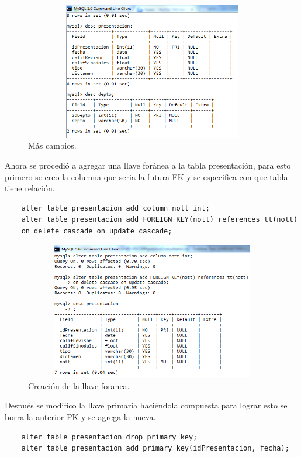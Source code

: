 \documentclass[12pt, titlepage]{article}
\begin{document}
\begin{figure}[H]
    \begin{center}
        \includegraphics[width=12cm, height=6cm]{img/mascambios.png}
        \caption{Más cambios.}
        \label{fig:cambios2}
    \end{center}
\end{figure}
    Ahora se procedió a agregar una llave foránea a la tabla presentación, para esto primero se creo la columna que seria la futura FK y se especifica con que tabla tiene relación.
    \begin{lstlisting}
    alter table presentacion add column nott int;
    alter table presentacion add FOREIGN KEY(nott) references tt(nott)
    on delete cascade on update cascade;
    \end{lstlisting}
    \begin{figure}[H]
        \begin{center}
            \includegraphics[width=12cm, height=6cm]{img/foranea.png}
            \caption{Creación de la llave foranea.}
            \label{fig:foranea}
        \end{center}
    \end{figure}
    Después se modifico la llave primaria haciéndola compuesta para lograr esto se borra la anterior PK y se agrega la nueva.
    \begin{lstlisting}
    alter table presentacion drop primary key;
    alter table presentacion add primary key(idPresentacion, fecha);
    \end{lstlisting}
\end{document}
